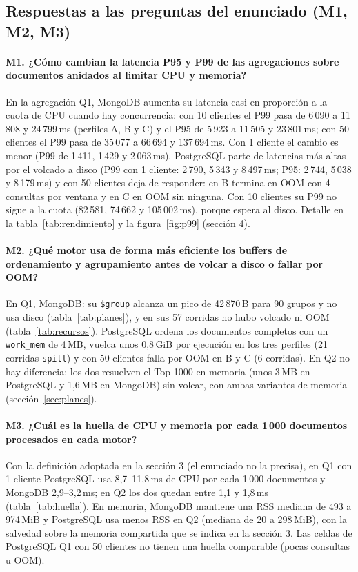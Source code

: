 \documentclass[11pt,a4paper]{article}
\newcommand{\cod}[1]{\texttt{#1}}
\begin{document}
\subsection{Respuestas a las preguntas del enunciado (M1, M2, M3)}

\paragraph{M1. ¿Cómo cambian la latencia P95 y P99 de las agregaciones sobre documentos
anidados al limitar CPU y memoria?} En la agregación Q1, MongoDB aumenta su latencia casi
en proporción a la cuota de CPU cuando hay concurrencia: con 10 clientes el P99 pasa de
6\,090 a 11\,808 y 24\,799\,ms (perfiles A, B y C) y el P95 de 5\,923 a 11\,505 y
23\,801\,ms; con 50 clientes el P99 pasa de 35\,077 a 66\,694 y 137\,694\,ms. Con 1 cliente
el cambio es menor (P99 de 1\,411, 1\,429 y 2\,063\,ms). PostgreSQL parte de latencias más
altas por el volcado a disco (P99 con 1 cliente: 2\,790, 5\,343 y 8\,497\,ms; P95: 2\,744,
5\,038 y 8\,179\,ms) y con 50 clientes deja de responder: en B termina en OOM con 4
consultas por ventana y en C en OOM sin ninguna. Con 10 clientes su P99 no sigue a la
cuota (82\,581, 74\,662 y 105\,002\,ms), porque espera al disco. Detalle en la
tabla~\ref{tab:rendimiento} y la figura~\ref{fig:p99} (sección 4).

\paragraph{M2. ¿Qué motor usa de forma más eficiente los buffers de ordenamiento y
agrupamiento antes de volcar a disco o fallar por OOM?} En Q1, MongoDB: su \cod{\$group}
alcanza un pico de 42\,870\,B para 90 grupos y no usa disco (tabla~\ref{tab:planes}), y en
sus 57 corridas no hubo volcado ni OOM (tabla~\ref{tab:recursos}). PostgreSQL ordena los
documentos completos con un \cod{work\_mem} de 4\,MB, vuelca unos 0,8\,GiB por ejecución
en los tres perfiles (21 corridas \cod{spill}) y con 50 clientes falla por OOM en B y C
(6 corridas). En Q2 no hay diferencia: los dos resuelven el Top-1000 en memoria (unos
3\,MB en PostgreSQL y 1,6\,MB en MongoDB) sin volcar, con ambas variantes de memoria
(sección~\ref{sec:planes}).

\paragraph{M3. ¿Cuál es la huella de CPU y memoria por cada 1\,000 documentos procesados en
cada motor?} Con la definición adoptada en la sección 3 (el enunciado no la precisa), en Q1
con 1 cliente PostgreSQL
usa 8,7--11,8\,ms de CPU por cada 1\,000 documentos y MongoDB 2,9--3,2\,ms; en Q2 los dos
quedan entre 1,1 y 1,8\,ms (tabla~\ref{tab:huella}). En memoria, MongoDB mantiene una RSS
mediana de 493 a 974\,MiB y PostgreSQL usa menos RSS en Q2 (mediana de 20 a 298\,MiB), con la salvedad sobre
la memoria compartida que se indica en la sección 3. Las celdas de PostgreSQL Q1 con 50
clientes no tienen una huella comparable (pocas consultas u OOM).
\end{document}

